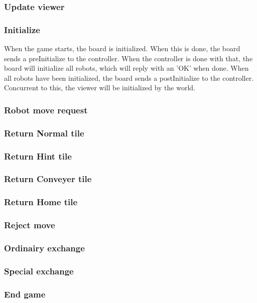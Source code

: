     \subsubsection{Update viewer}
    

	\subsubsection{Initialize}
	When the game starts, the board is initialized. When this is done, the board sends a preInitialize to the controller. When the controller is done with that, the board will initialize all robots, which will reply with an 'OK' when done. When all robots have been initialized, the board sends a postInitialize to the controller. Concurrent to this, the viewer will be initialized by the world.
  	
    	
	\subsubsection{Robot move request}
	
	

	\subsubsection{Return Normal tile}
	

	\subsubsection{Return Hint tile}
	

	\subsubsection{Return Conveyer tile}
	

	\subsubsection{Return Home tile}
	


	\subsubsection{Reject move}
	


	\subsubsection{Ordinairy exchange}
	
	
	\subsubsection{Special exchange}
	
	
	\subsubsection{End game}
	
